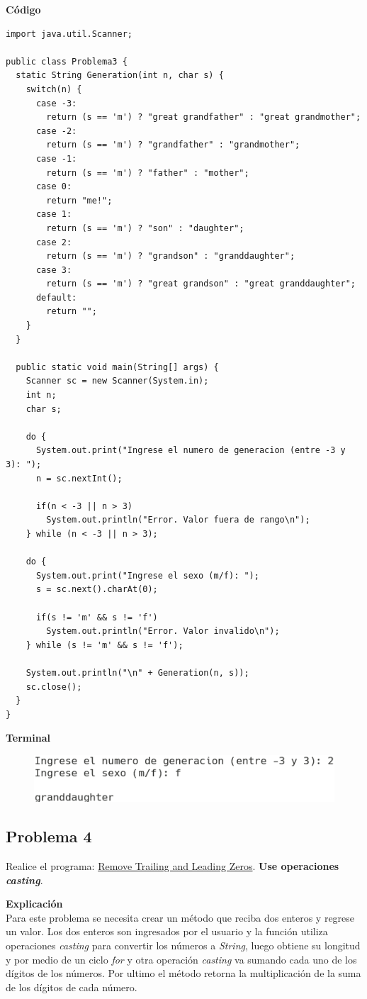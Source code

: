 \documentclass[11pt, twocolumn]{article}
\begin{document}
  \textbf{Código}
  \begin{lstlisting}
import java.util.Scanner;

public class Problema3 {
  static String Generation(int n, char s) {
    switch(n) {
      case -3:
        return (s == 'm') ? "great grandfather" : "great grandmother";
      case -2:
        return (s == 'm') ? "grandfather" : "grandmother";
      case -1:
        return (s == 'm') ? "father" : "mother";
      case 0:
        return "me!";
      case 1:
        return (s == 'm') ? "son" : "daughter";
      case 2:
        return (s == 'm') ? "grandson" : "granddaughter";
      case 3:
        return (s == 'm') ? "great grandson" : "great granddaughter";
      default:
        return "";
    }
  }   

  public static void main(String[] args) {
    Scanner sc = new Scanner(System.in);
    int n;
    char s;
    
    do {
      System.out.print("Ingrese el numero de generacion (entre -3 y 3): ");
      n = sc.nextInt();

      if(n < -3 || n > 3)
        System.out.println("Error. Valor fuera de rango\n");
    } while (n < -3 || n > 3);

    do {
      System.out.print("Ingrese el sexo (m/f): ");
      s = sc.next().charAt(0);

      if(s != 'm' && s != 'f')
        System.out.println("Error. Valor invalido\n");
    } while (s != 'm' && s != 'f');

    System.out.println("\n" + Generation(n, s));
    sc.close();
  }
}    
  \end{lstlisting}

  \textbf{Terminal}
  \begin{figure}[ht]
    \includegraphics[width=0.8\columnwidth, center]{P3.png}
  \end{figure}

  \subsection*{Problema 4}
  Realice el programa:  \href{https://edabit.com/challenge/7CWbYfRji9yhna9tf}{Remove Trailing and Leading Zeros}. \textbf{Use operaciones \textit{casting}}.

  \textbf{Explicación} \\
  Para este problema se necesita crear un método que reciba dos enteros y regrese un valor. Los dos enteros son ingresados por el usuario y la función utiliza operaciones \textit{casting} para convertir los números a \textit{String}, luego obtiene su longitud y por medio de un ciclo \textit{for} y otra operación \textit{casting} va sumando cada uno de los dígitos de los números. Por ultimo el método retorna la multiplicación de la suma de los dígitos de cada número.
\end{document}
